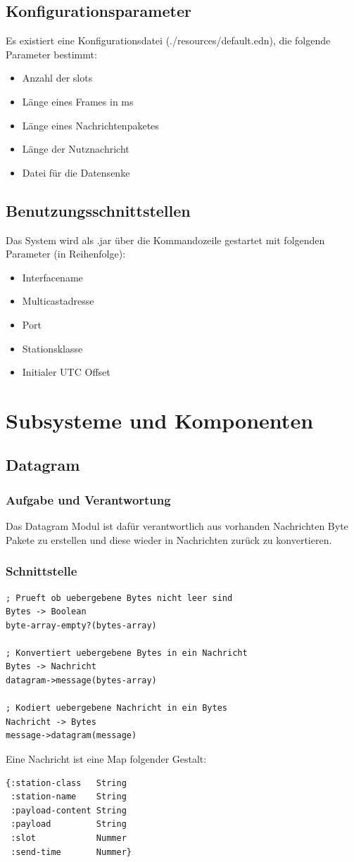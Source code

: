 \documentclass[draft=false
              ,paper=a4
              ,twoside=false
              ,fontsize=11pt
              ,headsepline
              ,BCOR10mm
              ,DIV11
              ]{scrbook}
\begin{document}
\section{Konfigurationsparameter}
Es existiert eine Konfigurationsdatei (./resources/default.edn), die folgende Parameter bestimmt:
\begin{itemize}
	\item Anzahl der slots
	\item Länge eines Frames in ms
	\item Länge eines Nachrichtenpaketes
	\item Länge der Nutznachricht
	\item Datei für die Datensenke
\end{itemize}

\section{Benutzungsschnittstellen}
Das System wird als .jar über die Kommandozeile gestartet mit folgenden Parameter (in Reihenfolge):
\begin{itemize}
	\item Interfacename 
	\item Multicastadresse
	\item Port
	\item Stationsklasse
	\item Initialer UTC Offset
\end{itemize}

\chapter{Subsysteme und Komponenten}
\section{Datagram}
\subsection{Aufgabe und Verantwortung}
Das Datagram Modul ist dafür verantwortlich aus vorhanden Nachrichten Byte Pakete zu erstellen und diese wieder in Nachrichten zurück zu konvertieren.

\subsection{Schnittstelle}
\begin{lstlisting}
; Prueft ob uebergebene Bytes nicht leer sind
Bytes -> Boolean
byte-array-empty?(bytes-array)

; Konvertiert uebergebene Bytes in ein Nachricht
Bytes -> Nachricht
datagram->message(bytes-array)

; Kodiert uebergebene Nachricht in ein Bytes
Nachricht -> Bytes
message->datagram(message)
\end{lstlisting}
Eine Nachricht ist eine Map folgender Gestalt:
\begin{lstlisting}
{:station-class   String
 :station-name    String
 :payload-content String
 :payload         String
 :slot            Nummer
 :send-time       Nummer}
\end{lstlisting}
\end{document}
